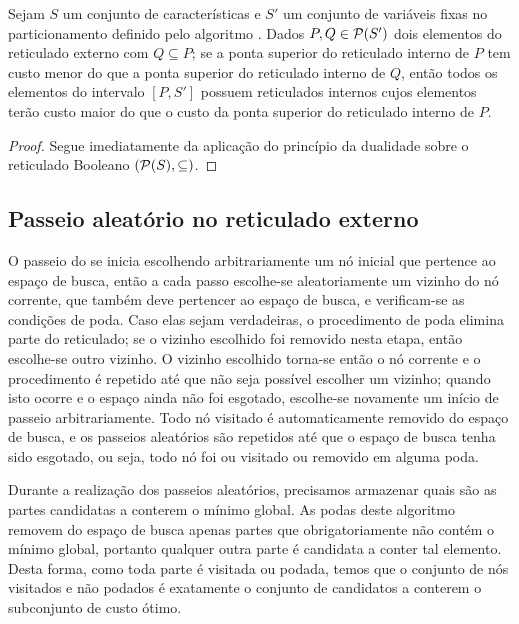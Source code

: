 \begin{corollary}
\label{theorem:pucs:pruning_dual}
Sejam $S$ um conjunto de características e $S'$ um conjunto de variáveis
fixas no particionamento definido pelo algoritmo . Dados
$P, Q \in \mathcal{P} (S')$ dois elementos do reticulado externo com 
$Q \subseteq P$; se a ponta superior do reticulado interno de $P$ tem 
custo menor do que a ponta superior do reticulado interno de $Q$, então todos os elementos do intervalo $[P, S']$ possuem reticulados internos cujos elementos terão custo maior do que o custo da ponta superior do reticulado interno de $P$.
\end{corollary}

\begin{proof}
Segue imediatamente da aplicação do princípio da dualidade sobre o reticulado Booleano $(\mathcal{P} (S), \subseteq)$.
\end{proof}

\subsection{Passeio aleatório no reticulado externo}
O passeio do  se inicia escolhendo arbitrariamente um nó 
inicial que pertence ao espaço de busca, então a cada passo escolhe-se 
aleatoriamente um vizinho do nó corrente, que também deve pertencer ao 
espaço de busca, e verificam-se as condições de poda. Caso elas sejam 
verdadeiras, o procedimento de poda elimina parte do reticulado; se o 
vizinho escolhido foi removido nesta etapa, então escolhe-se outro 
vizinho. O vizinho escolhido torna-se então o nó corrente e o 
procedimento é repetido até que não seja possível escolher um vizinho; 
quando isto ocorre e o espaço ainda não foi esgotado, escolhe-se 
novamente um início de passeio arbitrariamente. Todo nó visitado é 
automaticamente removido do espaço de busca, e os passeios aleatórios
são repetidos até que o espaço de busca tenha sido esgotado, ou seja,
todo nó foi ou visitado ou removido em alguma poda.

Durante a realização dos passeios aleatórios, precisamos armazenar quais
são as partes candidatas a conterem o mínimo global. As podas deste 
algoritmo removem do espaço de busca apenas partes que obrigatoriamente 
não contém o mínimo global, portanto qualquer outra parte é candidata a 
conter tal elemento. Desta forma, como toda parte é visitada ou podada, 
temos que o conjunto de nós visitados e não podados é exatamente o 
conjunto de candidatos a conterem o subconjunto de custo ótimo.

